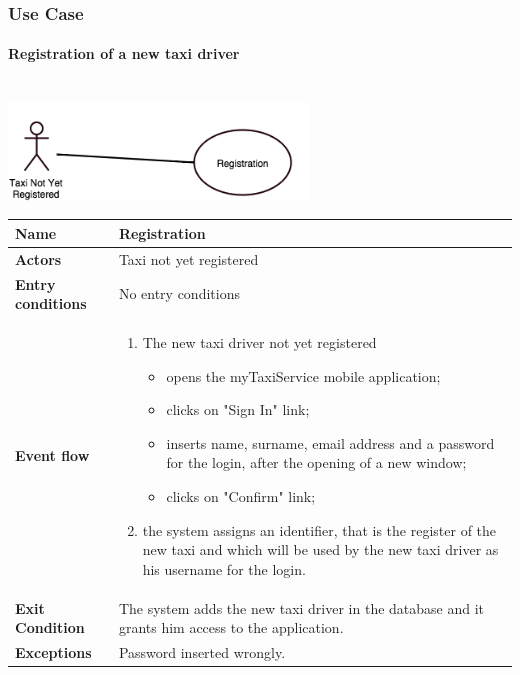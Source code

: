 \subsubsection{Use Case}
			\paragraph{Registration of a new taxi driver}
			\begin{center}
			~\\
			\includegraphics[width=0.60\textwidth]{./images/UseCaseTaxiNotYetRegistered.png}~
			\end{center}
			\begin{tabular}{l l}
		 \textbf {Name} & Registration  \\ \hline
		 \textbf{Actors} & Taxi not yet registered \\ \hline
		 \textbf{Entry conditions} & No entry conditions \\ \hline
		 \textbf{Event flow} & 
		 \parbox{0.7\textwidth}{
		 \begin{enumerate}
		 \item The new taxi driver not yet registered
		    \begin{itemize}
		    \item opens the myTaxiService mobile application;
		    \item clicks on "Sign In" link;
		    \item inserts name, surname, email address and a password for the login, after the opening of a new window;
		    \item clicks on "Confirm" link;
		    \end{itemize}
		 \item the system assigns an identifier, that is the register of the new taxi and which will be used by the new taxi driver as his username for the login.
		 \end{enumerate}
		 } \\ \hline
		 \textbf{Exit Condition} &  \parbox{0.7\textwidth}{The system adds the new taxi driver in the database and it grants him access to the application.} \\ \hline
		 \textbf{Exceptions} & Password inserted wrongly.
		\end{tabular}
		
